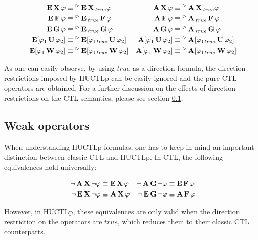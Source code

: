  \begin{align*}
 \ctlE\ctlX \varphi							& \equiv \future\ctlE\dctlX{true} \varphi &
 \ctlA\ctlX \varphi							& \equiv \future\ctlA\dctlX{true} \varphi \\ 
 \ctlE\ctlF \varphi							& \equiv \future\ctlE\dctlF{true} \varphi &
 \ctlA\ctlF \varphi							& \equiv \future\ctlA\dctlF{true} \varphi \\ 
 \ctlE\ctlG \varphi							& \equiv \future\ctlE\dctlG{true} \varphi &
 \ctlA\ctlG \varphi							& \equiv \future\ctlA\dctlG{true} \varphi \\ 
 \ctlE[\varphi_1 \ctlU \varphi_2] 	 & \equiv \future\ctlE[\varphi_1 \dctlUl{true} \varphi_2] &
 \ctlA[\varphi_1 \ctlU \varphi_2] 	 & \equiv \future\ctlA[\varphi_1 \dctlUl{true} \varphi_2] \\
 \ctlE[\varphi_1 \ctlW \varphi_2] 	 & \equiv \future\ctlE[\varphi_1 \dctlWl{true} \varphi_2] &
 \ctlA[\varphi_1 \ctlW \varphi_2] 	 & \equiv \future\ctlA[\varphi_1 \dctlWl{true} \varphi_2] \\
 \end{align*}
 
As one can easily observe, by using $true$ as a direction formula, the direction restrictions imposed by \ac{HUCTLp} can be easily ignored and the pure \ac{CTL} operators are obtained. For a further discussion on the effects of direction restrictions on the \ac{CTL} semantics, please see section \ref{sec:weak}.

\subsection{Weak operators}
\label{sec:weak}

When understanding \ac{HUCTLp} formulas, one has to keep in mind an important distinction between classic \ac{CTL} and \ac{HUCTLp}. In \ac{CTL}, the following equivalences hold universally:

\begin{align*}
	\neg \ctlA\ctlX \neg \varphi 			& \equiv \ctlE\ctlX \varphi &
	\neg \ctlA\ctlG \neg \varphi 			& \equiv \ctlE\ctlF \varphi \\
	\neg \ctlE\ctlX \neg \varphi 			& \equiv \ctlA\ctlX \varphi &
	\neg \ctlE\ctlG \neg \varphi 			& \equiv \ctlA\ctlF \varphi \\
\end{align*}

However, in \ac{HUCTLp}, these equivalences are only valid when the direction restriction on the operators are $true$, which reduces them to their classic \ac{CTL} counterparts.

